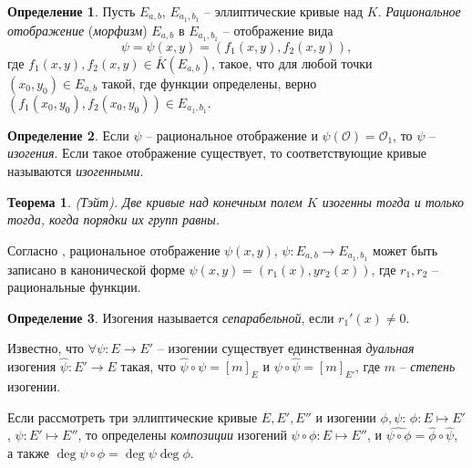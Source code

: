 \documentclass[a4paper,12pt]{article}
\newtheorem{theorem}{Теорема}
\theoremstyle{definition}
\newtheorem{definition}{Определение}
\begin{document}

\begin{definition}
Пусть $E_{a,b}$, $E_{a_1,b_1}$ -- эллиптические кривые над $K$. \emph{Рациональное отображение} (\emph{морфизм}) $E_{a,b}$ в $E_{a_1,b_1}$ -- отображение вида
$$
\psi=\psi(x,y)=(f_1(x,y),f_2(x,y)),
$$
где $f_1(x,y),f_2(x,y)\in\overline{K}(E_{a,b})$, такое, что для любой точки $(x_0,y_0)\in E_{a,b}$ такой, где функции определены,
верно $(f_1(x_0,y_0),f_2(x_0,y_0))\in E_{a_1,b_1}.$
\end{definition}


\begin{definition}
Если $\psi$ -- рациональное отображение и $\psi(\mathcal{O})=\mathcal{O}_1$, то $\psi$ -- \emph{изогения}.
Если такое отображение существует, то соответствующие кривые называются \emph{изогенными}.
\end{definition}

\begin{theorem} (Тэйт).
Две кривые над  конечным полем $K$ изогенны тогда и только тогда, когда порядки их групп равны.
\end{theorem}

Согласно \cite[2.9]{Wash}, рациональное отображение $\psi(x,y)$, $\psi:E_{a,b}\to E_{a_1,b_1}$ 
может быть записано в канонической форме $\psi(x,y)=(r_1(x),yr_2(x))$, где $r_1,r_2$ -- рациональные функции.

\begin{definition}
Изогения называется \emph{сепарабельной}, если $r_1'(x)\neq 0$.
\end{definition}

Известно, что  $\forall \psi:E\to E'$ -- изогении  существует единственная \emph{дуальная} изогения $\hat{\psi}:E'\to E$ такая, что $\hat{\psi}\circ \psi=[m]_E$ и $\psi\circ\hat{\psi}=[m]_{E'}$, где $m$ -- \emph{степень} изогении.

Если рассмотреть три эллиптические кривые $E,E',E''$ и изогении $\phi,\psi$: $\phi:E\mapsto E'$, $\psi:E'\mapsto E''$,
то определены \emph{композиции} изогений $\psi\circ\phi:E\mapsto E''$, и $\widehat{\psi\circ\phi}=\hat{\phi}\circ\hat{\psi}$, а также $\deg \psi\circ\phi=\deg\psi \deg\phi$.
\end{document}
